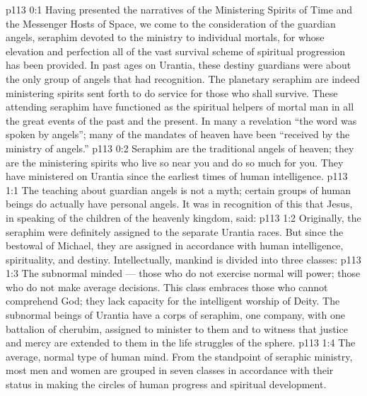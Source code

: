 \author{Chief of Seraphim}
\vs p113 0:1 Having presented the narratives of the Ministering Spirits of Time and the Messenger Hosts of Space, we come to the consideration of the guardian angels, seraphim devoted to the ministry to individual mortals, for whose elevation and perfection all of the vast survival scheme of spiritual progression has been provided. In past ages on Urantia, these destiny guardians were about the only group of angels that had recognition. The planetary seraphim are indeed ministering spirits sent forth to do service for those who shall survive. These attending seraphim have functioned as the spiritual helpers of mortal man in all the great events of the past and the present. In many a revelation “the word was spoken by angels”; many of the mandates of heaven have been “received by the ministry of angels.”
\vs p113 0:2 Seraphim are the traditional angels of heaven; they are the ministering spirits who live so near you and do so much for you. They have ministered on Urantia since the earliest times of human intelligence.
\vs p113 1:1 The teaching about guardian angels is not a myth; certain groups of human beings do actually have personal angels. It was in recognition of this that Jesus, in speaking of the children of the heavenly kingdom, said: 
\vs p113 1:2 Originally, the seraphim were definitely assigned to the separate Urantia races. But since the bestowal of Michael, they are assigned in accordance with human intelligence, spirituality, and destiny. Intellectually, mankind is divided into three classes:
\vs p113 1:3 \bibnobreakspace The subnormal minded --- those who do not exercise normal will power; those who do not make average decisions. This class embraces those who cannot comprehend God; they lack capacity for the intelligent worship of Deity. The subnormal beings of Urantia have a corps of seraphim, one company, with one battalion of cherubim, assigned to minister to them and to witness that justice and mercy are extended to them in the life struggles of the sphere.
\vs p113 1:4 \bibnobreakspace The average, normal type of human mind. From the standpoint of seraphic ministry, most men and women are grouped in seven classes in accordance with their status in making the circles of human progress and spiritual development.
